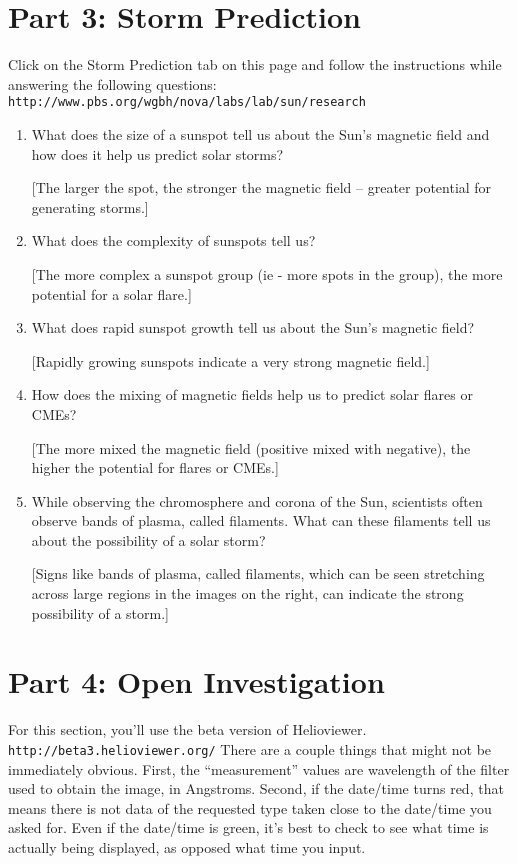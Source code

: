 \documentclass[11pt]{article}%
\begin{document}
\section*{Part 3: Storm Prediction}
Click on the Storm Prediction tab on this page and follow the instructions while answering the following questions: {\tt http://www.pbs.org/wgbh/nova/labs/lab/sun/research}
\begin{enumerate}
\item  What does the size of a sunspot tell us about the Sun's magnetic field and how does it help us predict solar storms?

[The larger the spot, the stronger the magnetic field -- greater potential for generating storms.]

\item  What does the complexity of sunspots tell us?

[The more complex a sunspot group (ie - more spots in the group), the more potential for a solar flare.]

\item What does rapid sunspot growth tell us about the Sun's magnetic field?

[Rapidly growing sunspots indicate a very strong magnetic field.]

\item  How does the mixing of magnetic fields help us to predict solar flares or CMEs?

[The more mixed the magnetic field (positive mixed with negative), the higher the potential for flares or CMEs.]

\item While observing the chromosphere and corona of the Sun, scientists often observe bands of plasma, called filaments. What can these filaments tell us about the possibility of a solar storm?

[Signs like bands of plasma, called filaments, which can be seen stretching across large regions in the images on the right, can indicate the strong possibility of a storm.]

\end{enumerate}


\section*{Part 4: Open Investigation}
For this section, you'll use the beta version of Helioviewer. {\tt http://beta3.helioviewer.org/}
There are a couple things that might not be immediately obvious. First, the ``measurement'' values are wavelength of the filter used to obtain the image, in Angstroms. Second, if the date/time turns red, that means there is not data of the requested type taken close to the date/time you asked for. Even if the date/time is green, it's best to check to see what time is actually being displayed, as opposed what time you input. 
\end{document}
